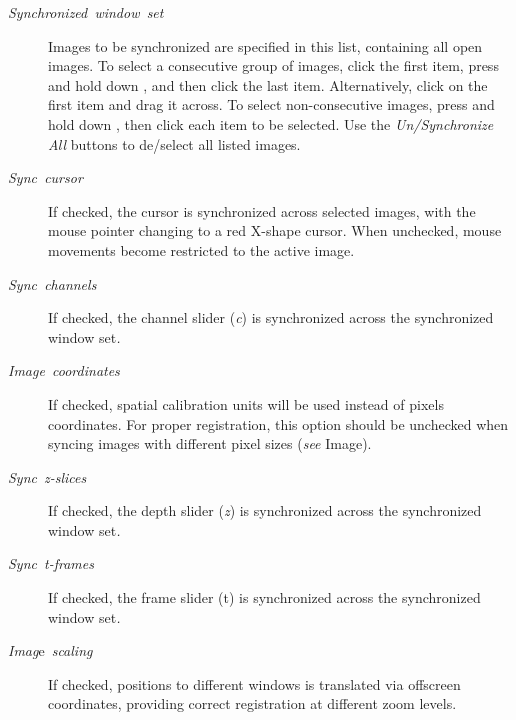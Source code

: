 \begin{description}
\item [{\emph{Synchronized\ window\ set}}] Images to be synchronized
are specified in this list, containing all open images. To select
a consecutive group of images, click the first item, press and hold
down , and then click the last item. Alternatively,
click on the first item and drag it across. To select non-consecutive
images, press and hold down , then click each item
to be selected. Use the \emph{Un/Synchronize All} buttons to de/select
all listed images.
\item [{\emph{Sync\ cursor}}] If checked, the cursor is synchronized across
selected images, with the mouse pointer changing to a red X-shape
cursor. When unchecked, mouse movements become restricted to the active
image.
\item [{\emph{Sync\ channels}}] If checked, the channel slider (\emph{c})
is synchronized across the synchronized window set\emph{.}
\item [{\emph{Image\ coordinates}}] If checked, spatial calibration units
will be used instead of pixels coordinates. For proper registration,
this option should be unchecked when syncing images with different
pixel sizes (\emph{see} Image\lyxarrow{}).
\item [{\emph{Sync}\ \emph{z-slices}}] If checked, the depth slider (\emph{z})
is synchronized across the synchronized window set\emph{.}
\item [{\emph{Sync}\ \emph{t-frames}}] If checked, the frame slider (t)
is synchronized across the synchronized window set\emph{.}
\item [{\emph{Imag}e\ \emph{scaling}}] If checked, positions to different
windows is translated via offscreen coordinates, providing correct
registration at different zoom levels.
\end{description}


\newpage{}


\section{\protect{}\label{sec:Plugins}}


\subsection{\protect{}\label{sub:Macros}}

